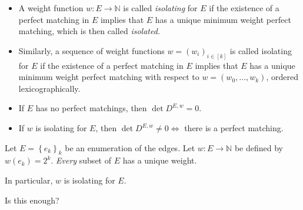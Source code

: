 \documentclass{beamer}
\theoremstyle{remark}
\newcommand{\nn}{\mathbb{N}}
\begin{document}
\begin{frame}[allowframebreaks]
  \begin{definitions}
    \begin{itemize}
      \item A weight function $w : E \to \nn$ is called \emph{isolating} for
      $E$ if the existence of a perfect matching in $E$
      implies that $E$ has a unique minimum weight perfect matching,
      which is then called \emph{isolated}.

      \item Similarly, a sequence of weight functions $w = {\left(w_i\right)}_{i \in [k]}$
      is called isolating for $E$ if the existence of a perfect matching
      in $E$ implies that $E$ has a unique minimum weight perfect matching
      with respect to $w = (w_0, \ldots, w_k)$, ordered lexicographically.
    \end{itemize}
  \end{definitions}

  \begin{corollary}
    \begin{itemize}
      \item If $E$ has no perfect matchings, then
            $\det D^{E,w} = 0$.
      \item If $w$ is isolating for $E$,
            then $\det D^{E,w} \ne 0 \iff $ there is a perfect matching.
    \end{itemize}
  \end{corollary}
\end{frame}

\begin{frame}
  \begin{example}
    Let $E = \left\{e_k\right\}_k$ be an enumeration of the edges.
    Let $w : E \to \nn$ be defined by
    $w(e_k) = 2^k$. \emph{Every} subset of $E$ has a unique
    weight.

    In particular, $w$ is isolating for $E$.

    Is this enough?
  \end{example}
\end{frame}
\end{document}
